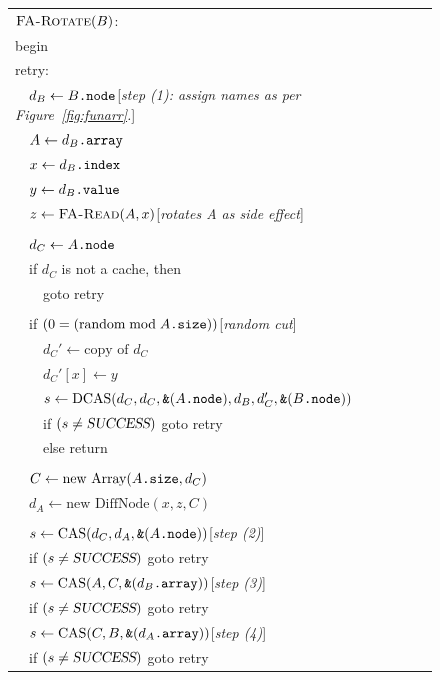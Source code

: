 \begin{figure}\centering%
\sis%
\renewcommand{\>}{~~}%
\newcommand{\com}[1]{\hfill [{\sl #1}]}%
\begin{tabular}{l}%
$\text{\sc FA-Rotate}(B)$:\\
begin\\
retry:\\
\>$d_B \gets B\text{\tt .node}$\com{step (1): assign names as per Figure~\ref{fig:funarr}.}\\
\>$A \gets d_B\text{\tt .array}$\\
\>$x \gets d_B\text{\tt .index}$\\
\>$y \gets d_B\text{\tt .value}$\\
\>$z \gets \text{\sc FA-Read}(A, x)$\com{rotates A as side effect}\\
\\
\>$d_C \gets A\text{\tt .node}$\\
\>if $d_C$ is not a cache, then \\
\>\>goto retry\\
\\
\>if $(0 = (\text{random} \bmod A\text{\tt .size}))$\com{random cut}\\
\>\>$d_C' \gets \text{copy of }d_C$\\
\>\>$d_C'[x] \gets y$\\
\>\>$s\gets\text{DCAS}(d_C, d_C, \text{\tt \&}(A\text{\tt .node}), d_B, d_C', \text{\tt \&}(B\text{\tt .node}))$\\
\>\>if $(s \neq \text{\sl SUCCESS})$ goto retry\\
\>\>else return\\
\\
\>$C \gets \text{new Array}(A\text{\tt .size}, d_C)$\\
\>$d_A \gets \text{new DiffNode}(x, z, C)$\\
\\
\>$s \gets \text{CAS}(d_C, d_A, \text{\tt \&}(A\text{\tt .node}))$\com{step (2)}\\
\>if $(s\neq \text{\sl SUCCESS})$ goto retry\\
\>$s\gets\text{CAS}(A, C, \text{\tt \&}(d_B\text{\tt .array}))$\com{step (3)}\\
\>if $(s\neq \text{\sl SUCCESS})$ goto retry\\
\>$s \gets\text{CAS}(C, B, \text{\tt \&}(d_A\text{\tt .array}))$\com{step (4)}\\
\>if $(s\neq \text{\sl SUCCESS})$ goto retry\\

\end{tabular}
\end{figure}
